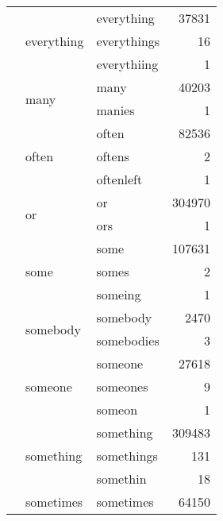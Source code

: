 \begin{longtable}[ht]{lllr}
\cline{2-4}
 & \multirow[c]{3}{*}{everything} & everything & {\cellcolor[HTML]{E9C2F6}} \color[HTML]{000000} 37831 \\
 &  & everythings & {\cellcolor[HTML]{E6E6FA}} \color[HTML]{000000} 16 \\
 &  & everythiing & {\cellcolor[HTML]{E6E6FA}} \color[HTML]{000000} 1 \\
\cline{2-4}
 & \multirow[c]{2}{*}{many} & many & {\cellcolor[HTML]{E9BFF5}} \color[HTML]{000000} 40203 \\
 &  & manies & {\cellcolor[HTML]{E6E6FA}} \color[HTML]{000000} 1 \\
\cline{2-4}
 & \multirow[c]{3}{*}{often} & often & {\cellcolor[HTML]{EC96F0}} \color[HTML]{000000} 82536 \\
 &  & oftens & {\cellcolor[HTML]{E6E6FA}} \color[HTML]{000000} 2 \\
 &  & oftenleft & {\cellcolor[HTML]{E6E6FA}} \color[HTML]{000000} 1 \\
\cline{2-4}
 & \multirow[c]{2}{*}{or} & or & {\cellcolor[HTML]{4D0082}} \color[HTML]{F1F1F1} 304970 \\
 &  & ors & {\cellcolor[HTML]{E6E6FA}} \color[HTML]{000000} 1 \\
\cline{2-4}
 & \multirow[c]{3}{*}{some} & some & {\cellcolor[HTML]{E97CE9}} \color[HTML]{F1F1F1} 107631 \\
 &  & somes & {\cellcolor[HTML]{E6E6FA}} \color[HTML]{000000} 2 \\
 &  & someing & {\cellcolor[HTML]{E6E6FA}} \color[HTML]{000000} 1 \\
\cline{2-4}
 & \multirow[c]{2}{*}{somebody} & somebody & {\cellcolor[HTML]{E6E4FA}} \color[HTML]{000000} 2470 \\
 &  & somebodies & {\cellcolor[HTML]{E6E6FA}} \color[HTML]{000000} 3 \\
\cline{2-4}
 & \multirow[c]{3}{*}{someone} & someone & {\cellcolor[HTML]{E8CCF7}} \color[HTML]{000000} 27618 \\
 &  & someones & {\cellcolor[HTML]{E6E6FA}} \color[HTML]{000000} 9 \\
 &  & someon & {\cellcolor[HTML]{E6E6FA}} \color[HTML]{000000} 1 \\
\cline{2-4}
 & \multirow[c]{3}{*}{something} & something & {\cellcolor[HTML]{4B0082}} \color[HTML]{F1F1F1} 309483 \\
 &  & somethings & {\cellcolor[HTML]{E6E6FA}} \color[HTML]{000000} 131 \\
 &  & somethin & {\cellcolor[HTML]{E6E6FA}} \color[HTML]{000000} 18 \\
\cline{2-4}
 & sometimes & sometimes & {\cellcolor[HTML]{EBA8F3}} \color[HTML]{000000} 64150 \\
\cline{1-4} \cline{2-4}
\end{longtable}

